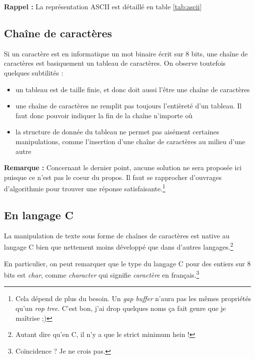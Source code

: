 \documentclass[../../../main.tex]{subfiles}
\begin{document}
\textbf{Rappel :} La représentation \textsf{ASCII} est détaillé en table \ref{tab:ascii}
\subsection{Chaîne de caractères}
Si un caractère est en informatique un mot binaire écrit sur 8 bits, une chaîne de caractères est basiquement un tableau de caractères. On observe toutefois quelques subtilités :
\begin{itemize}
  \item un tableau est de taille finie, et donc doit aussi l'être une chaîne de caractères
  \item une chaîne de caractères ne remplit pas toujours l'entièreté d'un tableau. Il faut donc pouvoir indiquer la fin de la chaîne n'importe où
  \item la structure de donnée du tableau ne permet pas aisément certaines manipulations, comme l'insertion d'une chaîne de caractères au milieu d'une autre
\end{itemize}
\textbf{Remarque :} Concernant le dernier point, aucune solution ne sera proposée ici puisque ce n'est pas le coeur du propos. Il faut se rapprocher d'ouvrages d'algorithmie pour trouver une réponse satisfaisante.\footnote{Cela dépend de plus du besoin. Un \textit{gap buffer} n'aura pas les mêmes propriétés qu'un \textit{rop tree}. C'est bon, j'ai drop quelques noms ça fait genre que je maîtrise ;)}
\subsection{En langage C}
La manipulation de texte sous forme de chaînes de caractères est native au langage C bien que nettement moins développé que dans d'autres langages.\footnote{Autant dire qu'en C, il n'y a que le strict minimum hein !}
 
En particulier, on peut remarquer que le type du langage C pour des entiers sur 8 bits est \textit{char}, comme \textit{character} qui signifie \textit{caractère} en français.\footnote{Coïncidence ? Je ne crois pas.}
 
\end{document}

